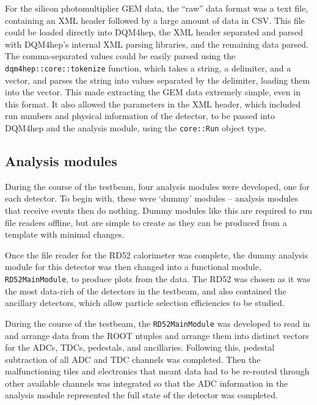 For the silicon photomultiplier \acrshort{GEM} data, the ``raw'' data format was a text file, containing an \acrshort{XML} header followed by a large amount of data in \acrfull{CSV}. This file could be loaded directly into \acrshort{DQM4hep}, the \acrshort{XML} header separated and parsed with \acrshort{DQM4hep}'s internal \acrshort{XML} parsing libraries, and the remaining data parsed. The comma-separated values could be easily parsed using the \texttt{dqm4hep::core::tokenize} function, which takes a string, a delimiter, and a vector, and parses the string into values separated by the delimiter, loading them into the vector. This made extracting the \acrshort{GEM} data extremely simple, even in this format. It also allowed the parameters in the \acrshort{XML} header, which included run numbers and physical information of the detector, to be passed into DQM4hep and the analysis module, using the \texttt{core::Run} object type.

\subsection{Analysis modules}
During the course of the testbeam, four analysis modules were developed, one for each detector. To begin with, these were `dummy' modules -- analysis modules that receive events then do nothing. Dummy modules like this are required to run file readers offline, but are simple to create as they can be produced from a template with minimal changes.

Once the file reader for the RD52 calorimeter was complete, the dummy analysis module for this detector was then changed into a functional module, \texttt{RD52MainModule}, to produce plots from the data. The RD52 was chosen as it was the most data-rich of the detectors in the testbeam, and also contained the ancillary detectors, which allow particle selection efficiencies to be studied.

During the course of the testbeam, the \texttt{RD52MainModule} was developed to read in and arrange data from the ROOT ntuples and arrange them into distinct vectors for the \acrshort{ADC}s, \acrshort{TDC}s, pedestals, and ancillaries. Following this, pedestal subtraction of all \acrshort{ADC} and \acrshort{TDC} channels was completed. Then the malfunctioning tiles and electronics that meant data had to be re-routed through other available channels was integrated so that the \acrshort{ADC} information in the analysis module represented the full state of the detector was completed. 

